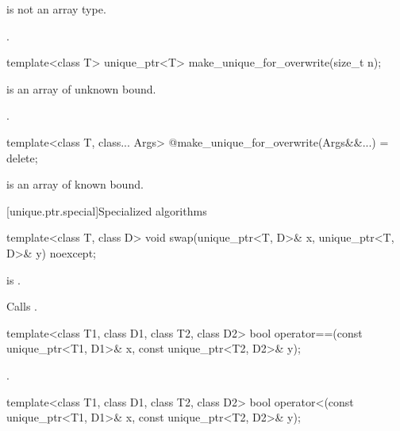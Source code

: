 \begin{itemdescr}
\pnum
\constraints
{} is not an array type.

\pnum
\returns
{}.
\end{itemdescr}

%
\begin{itemdecl}
template<class T> unique_ptr<T> make_unique_for_overwrite(size_t n);
\end{itemdecl}

\begin{itemdescr}
\pnum
\constraints
{} is an array of unknown bound.

\pnum
\returns
{}.
\end{itemdescr}

%
\begin{itemdecl}
template<class T, class... Args> @\unspec@ make_unique_for_overwrite(Args&&...) = delete;
\end{itemdecl}

\begin{itemdescr}
\pnum
\constraints
{} is an array of known bound.
\end{itemdescr}

[unique.ptr.special]{Specialized algorithms}

%
\begin{itemdecl}
template<class T, class D> void swap(unique_ptr<T, D>& x, unique_ptr<T, D>& y) noexcept;
\end{itemdecl}

\begin{itemdescr}
\pnum
\constraints
{} is .

\pnum
\effects
Calls .
\end{itemdescr}

%
\begin{itemdecl}
template<class T1, class D1, class T2, class D2>
  bool operator==(const unique_ptr<T1, D1>& x, const unique_ptr<T2, D2>& y);
\end{itemdecl}

\begin{itemdescr}
\pnum
\returns
{}.
\end{itemdescr}

%
\begin{itemdecl}
template<class T1, class D1, class T2, class D2>
  bool operator<(const unique_ptr<T1, D1>& x, const unique_ptr<T2, D2>& y);
\end{itemdecl}

